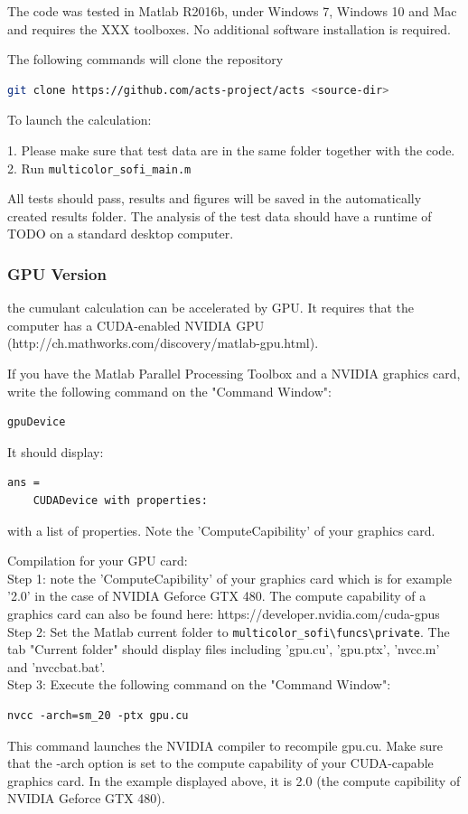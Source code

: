 \documentclass[final]{scrartcl}
\begin{document}
    The code was tested in Matlab R2016b, under Windows 7, Windows 10 and Mac and requires the XXX toolboxes. No additional software installation is required.

    The following commands will clone the repository
\begin{lstlisting}[language=bash] 
git clone https://github.com/acts-project/acts <source-dir>
\end{lstlisting}

    To launch the calculation:

    1.  Please make sure that test data are in the same folder together with the code.\\ 
    2.  Run \lstinline{multicolor_sofi_main.m}
    
        All tests should pass, results and figures will be saved in the
        automatically created results folder. The analysis of the test data should
        have a runtime of TODO on a standard desktop computer.

\subsubsection*{GPU Version}
    the cumulant calculation can be accelerated by GPU. It requires that the computer has a CUDA-enabled NVIDIA GPU (http://ch.mathworks.com/discovery/matlab-gpu.html).

    If you have the Matlab Parallel Processing Toolbox and a NVIDIA graphics card, write the following command on the "Command Window":
\begin{lstlisting}     
gpuDevice
\end{lstlisting}
    It should display:

\begin{lstlisting}
ans = 
	CUDADevice with properties:
\end{lstlisting}
    with a list of properties. Note the 'ComputeCapibility' of your graphics card.


    Compilation for your GPU card:\\ 
    Step 1: note the 'ComputeCapibility' of your graphics card which is for example '2.0' in the case of NVIDIA Geforce GTX 480. 
    The compute capability of a graphics card can also be found here: https://developer.nvidia.com/cuda-gpus\\
    Step 2: Set the Matlab current folder to \lstinline{multicolor_sofi\funcs\private}. The tab "Current folder" should display files including 'gpu.cu', 'gpu.ptx', 'nvcc.m' and 'nvccbat.bat'.\\
    Step 3: Execute the following command on the "Command Window": 
\begin{lstlisting}
nvcc -arch=sm_20 -ptx gpu.cu
\end{lstlisting}
    This command launches the NVIDIA compiler to recompile gpu.cu. Make sure that the -arch option is set to the compute capability of your CUDA-capable graphics card. In the example displayed above, it is 2.0 (the compute capibility of NVIDIA Geforce GTX 480).
\end{document}
